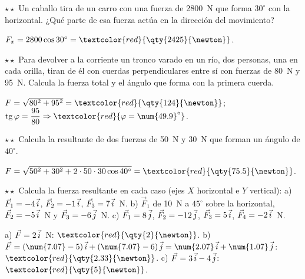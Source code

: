 \begin{exercise}
    \(\star\star\) Un caballo tira de un carro con una fuerza de \qty{2800}{\newton} que forma \(30^\circ\) con la horizontal. ¿Qué
    parte de esa fuerza actúa en la dirección del movimiento?
    \begin{solu}
        \(F_x = 2800\cos 30^\circ = \textcolor{red}{\qty{2425}{\newton}}\).
    \end{solu}
\end{exercise}

\begin{exercise}
    \(\star\star\) Para devolver a la corriente un tronco varado en un río, dos personas, una en cada orilla, tiran de él con cuerdas
    perpendiculares entre sí con fuerzas de \qty{80}{\newton} y \qty{95}{\newton}. Calcula la fuerza total y el ángulo que forma con
    la primera cuerda.
    \begin{solu}
        \(F = \sqrt{80^2 + 95^2} = \textcolor{red}{\qty{124}{\newton}}\); \(\tg\varphi = \dfrac{95}{80} \Rightarrow
        \textcolor{red}{\varphi = \num{49.9}^\circ}\).
    \end{solu}
\end{exercise}

\begin{exercise}
    \(\star\star\) Calcula la resultante de dos fuerzas de \qty{50}{\newton} y \qty{30}{\newton} que forman un ángulo de \(40^\circ\).
    \begin{solu}
        \(F = \sqrt{50^2 + 30^2 + 2 \cdot 50 \cdot 30\cos 40^\circ} = \textcolor{red}{\qty{75.5}{\newton}}\).
    \end{solu}
\end{exercise}

\begin{exercise}
    \(\star\star\) Calcula la fuerza resultante en cada caso (ejes \(X\) horizontal e \(Y\) vertical):
    a) \(\vec{F}_1 = -4\,\vec{i}\), \(\vec{F}_2 = -1\,\vec{i}\), \(\vec{F}_3 = 7\,\vec{i}\)~N.
    b) \(\vec{F}_1\) de \qty{10}{\newton} a \(45^\circ\) sobre la horizontal, \(\vec{F}_2 = -5\,\vec{i}\)~N y \(\vec{F}_3 = -6\,\vec{j}\)~N.
    c) \(\vec{F}_1 = 8\,\vec{j}\), \(\vec{F}_2 = -12\,\vec{j}\), \(\vec{F}_3 = 5\,\vec{i}\), \(\vec{F}_4 = -2\,\vec{i}\)~N.
    \begin{solu}
        a) \(\vec{F} = 2\,\vec{i}\)~N: \(\textcolor{red}{\qty{2}{\newton}}\). b) \(\vec{F} = (\num{7.07} - 5)\,\ivec + (\num{7.07} - 6)\,\jvec
        = \num{2.07}\,\ivec + \num{1.07}\,\jvec\): \(\textcolor{red}{\qty{2.33}{\newton}}\). c) \(\vec{F} = 3\,\vec{i} - 4\,\vec{j}\):
        \(\textcolor{red}{\qty{5}{\newton}}\).
    \end{solu}
\end{exercise}

